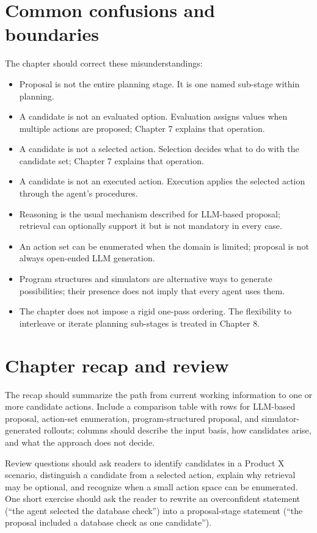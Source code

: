 \section{Common confusions and boundaries}
The chapter should correct these misunderstandings:
\begin{itemize}
  \item Proposal is not the entire planning stage. It is one named sub-stage within planning.
  \item A candidate is not an evaluated option. Evaluation assigns values when multiple actions are proposed; Chapter 7 explains that operation.
  \item A candidate is not a selected action. Selection decides what to do with the candidate set; Chapter 7 explains that operation.
  \item A candidate is not an executed action. Execution applies the selected action through the agent's procedures.
  \item Reasoning is the usual mechanism described for LLM-based proposal; retrieval can optionally support it but is not mandatory in every case.
  \item An action set can be enumerated when the domain is limited; proposal is not always open-ended LLM generation.
  \item Program structures and simulators are alternative ways to generate possibilities; their presence does not imply that every agent uses them.
  \item The chapter does not impose a rigid one-pass ordering. The flexibility to interleave or iterate planning sub-stages is treated in Chapter 8.
\end{itemize}

\section{Chapter recap and review}
The recap should summarize the path from current working information to one or more candidate actions. Include a comparison table with rows for LLM-based proposal, action-set enumeration, program-structured proposal, and simulator-generated rollouts; columns should describe the input basis, how candidates arise, and what the approach does not decide.

Review questions should ask readers to identify candidates in a Product X scenario, distinguish a candidate from a selected action, explain why retrieval may be optional, and recognize when a small action space can be enumerated. One short exercise should ask the reader to rewrite an overconfident statement (``the agent selected the database check'') into a proposal-stage statement (``the proposal included a database check as one candidate'').

